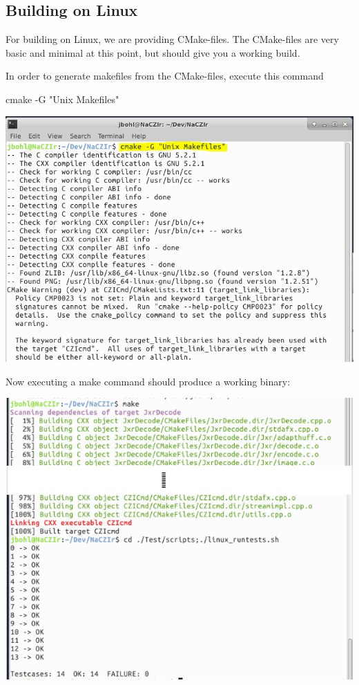  \subsection*{Building on Linux }

For building on Linux, we are providing C\+Make-\/files. The C\+Make-\/files are very basic and minimal at this point, but should give you a working build.

In order to generate makefiles from the C\+Make-\/files, execute this command \begin{DoxyVerb}cmake -G "Unix Makefiles"
\end{DoxyVerb}



\begin{DoxyImage}
\includegraphics[width=\textwidth,height=\textheight/2,keepaspectratio=true]{LinuxBuild_1.PNG}
\end{DoxyImage}
 Now executing a {\ttfamily make} command should produce a working binary\+:


\begin{DoxyImage}
\includegraphics[width=\textwidth,height=\textheight/2,keepaspectratio=true]{LinuxBuild_2.PNG}
\end{DoxyImage}


